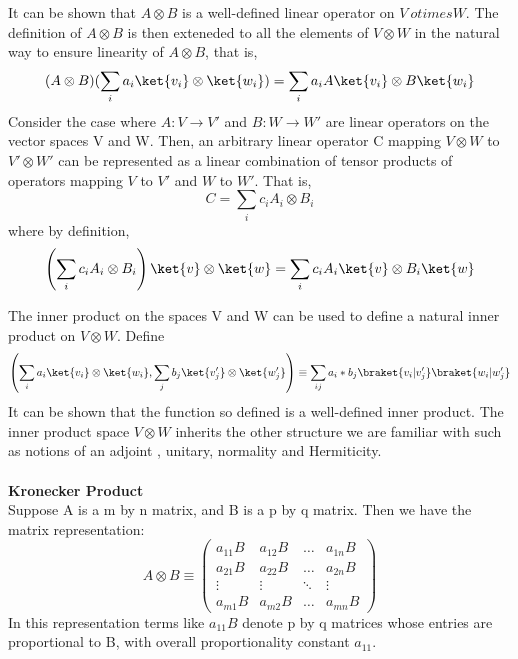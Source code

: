 \documentclass[12pt, oneside]{book}
\theoremstyle{definition}
\theoremstyle{definition}
\theoremstyle{remark}
\begin{document}
It can be shown that $A \otimes B$ is a well-defined linear operator on $V\ otimes W$. The definition of $A \otimes B$ is then exteneded to all the elements of $V \otimes W$ in the natural way to ensure linearity of $A \otimes B$, that is,
\[ (A \otimes B)(\sum_{i} a_{i} \ket{v_i} \otimes \ket{w_i}) = \sum_{i} a_i A\ket{v_i} \otimes B\ket{w_i} \]
Consider the case where $A:V \rightarrow V'$ and $B:W \rightarrow W'$ are linear operators on the vector spaces V and W. Then, 
an arbitrary linear operator C mapping $V \otimes W$ to $V' \otimes W'$ can be represented as a linear combination of tensor products of operators mapping 
$V$ to $V'$ and $W$ to $W'$. That is,
\[ C=\sum_{i} c_{i} A_i \otimes B_i \]
where by definition,
\[ \left( \sum_i c_i A_i \otimes B_i\right) \ket{v} \otimes \ket{w} = \sum_i c_i A_i \ket{v} \otimes B_i \ket{w} \]

The inner product on the spaces V and W can be used to define a natural inner product on $V \otimes W$. Define
\[ \left( \sum_i a_i\ket{v_i}\otimes \ket{w_i}, \sum_j b_j \ket{v'_j} \otimes \ket{w'_j}\right) \equiv \sum_{ij} a_i*b_j\braket{v_i|v'_j}\braket{w_i|w'_j} \]
It can be shown that the function so defined is a well-defined inner product. The inner product space $V \otimes W$ inherits the other structure we are familiar with such as notions of an adjoint , unitary, normality and Hermiticity.\\
\\
\textbf{Kronecker Product}\\
Suppose A is a m by n matrix, and B is a p by q matrix. Then we have the matrix representation:
\[ A \otimes B \equiv \begin{pmatrix} a_{11}B & a_{12}B & \ldots & a_{1n}B \\ a_{21}B & a_{22}B & \ldots & a_{2n}B \\ \vdots & \vdots & \ddots & \vdots \\ a_{m1}B & a_{m2}B & \ldots & a_{mn}B \end{pmatrix} \]
In this representation terms like $a_11B$ denote p by q matrices whose entries are proportional to B, with overall proportionality constant $a_{11}$. 
\end{document}
